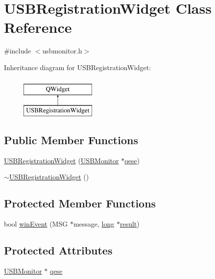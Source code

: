 \hypertarget{class_u_s_b_registration_widget}{\section{U\-S\-B\-Registration\-Widget Class Reference}
\label{class_u_s_b_registration_widget}
}


{\ttfamily \#include $<$usbmonitor.\-h$>$}

Inheritance diagram for U\-S\-B\-Registration\-Widget\-:\begin{figure}[H]
\begin{center}
\leavevmode
\includegraphics[height=2.000000cm]{class_u_s_b_registration_widget}
\end{center}
\end{figure}
\subsection*{Public Member Functions}
\begin{DoxyCompactItemize}
\item 
\hyperlink{group___raw_h_i_d_plugin_gaeaf0fb927142afa4e4233bfbd8fcb989}{U\-S\-B\-Registration\-Widget} (\hyperlink{class_u_s_b_monitor}{U\-S\-B\-Monitor} $\ast$\hyperlink{group___raw_h_i_d_plugin_ga0cc367841d16c562f474b130448cc184}{qese})
\item 
\hyperlink{group___raw_h_i_d_plugin_gaba711458acab7c2f26fbe576a10291c2}{$\sim$\-U\-S\-B\-Registration\-Widget} ()
\end{DoxyCompactItemize}
\subsection*{Protected Member Functions}
\begin{DoxyCompactItemize}
\item 
bool \hyperlink{group___raw_h_i_d_plugin_gacce70fd01437c66b524cc2f512ceece6}{win\-Event} (M\-S\-G $\ast$message, \hyperlink{ioapi_8h_a3c7b35ad9dab18b8310343c201f7b27e}{long} $\ast$\hyperlink{qxtslotjob_8h_aab161efab0511ea9612b64c40e9852ca}{result})
\end{DoxyCompactItemize}
\subsection*{Protected Attributes}
\begin{DoxyCompactItemize}
\item 
\hyperlink{class_u_s_b_monitor}{U\-S\-B\-Monitor} $\ast$ \hyperlink{group___raw_h_i_d_plugin_ga0cc367841d16c562f474b130448cc184}{qese}
\end{DoxyCompactItemize}



